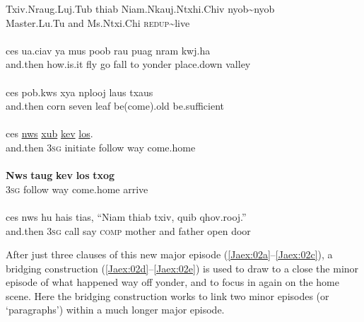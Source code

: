 \documentclass[output=paper]{LSP/langsci}
\begin{document}
\begin{exe}
\ex \label{Jaex:02af}
\begin{xlist}
\ex \label{Jaex:02a}
\gll Txiv.Nraug.Luj.Tub thiab Niam.Nkauj.Ntxhi.Chiv nyob{\textasciitilde}nyob\\
     Master.Lu.Tu       and   Ms.Ntxi.Chi \textsc{redup}{\textasciitilde}live\\
\glt {}\\
\ex \label{Jaex:02b}
\gll ces ua.ciav ya mus poob rau puag nram kwj.ha\\
and.then how.is.it fly go fall to yonder place.down valley\\ 
\glt {}\\
\ex \label{Jaex:02c}
\gll ces   pob.kws  xya  nplooj laus    txaus\\		
and.then  corn seven  leaf  be(come).old be.sufficient \\ 
\glt {}\\
\ex \label{Jaex:02d}
\gll ces \underline{nws} \underline{xub}  \underline{}  \underline{kev} \underline{los}.\\		           
and.then 3\textsc{sg} initiate follow way come.home\\
\glt {}\\
\ex \label{Jaex:02e}
\gll \textbf{Nws} \textbf{taug} \textbf{kev} \textbf{los} \textbf{txog} \\		           
 3\textsc{sg} follow way come.home  arrive\\
\glt {}\\
\ex \label{Jaex:02f}
\gll ces   nws hu  hais tias, ``Niam  thiab txiv,  quib qhov.rooj.''\\     	      
and.then 3\textsc{sg} call say \textsc{comp} mother and father open door\\
\glt {} \citep[][4]{johnson92}
\end{xlist}
\end{exe}

\noindent
After just three clauses of this new major episode (\ref{Jaex:02a}--\ref{Jaex:02c}), a bridging construction (\ref{Jaex:02d}--\ref{Jaex:02e}) is used to draw to a close the minor episode of what happened way off yonder, and to focus in again on the home scene. Here the bridging construction works to link two minor episodes (or `paragraphs') within a much longer major episode.
%
\end{document}
